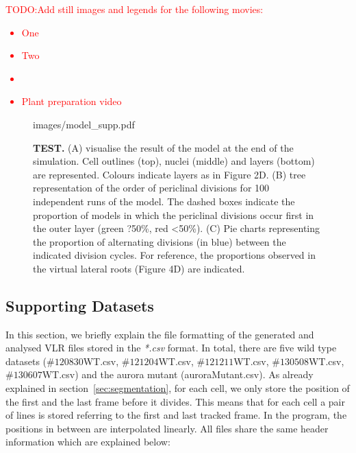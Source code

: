 \documentclass[11pt,a4paper, draft]{article}
\newcommand{\TODO}[1]{
\textcolor{red}{TODO:#1}
}
\begin{document}
%
\TODO{Add still images and legends for the following movies:
\begin{itemize}
  \item One
  \item Two
  \item 
  \item Plant preparation video
\end{itemize}
}
\begin{figure}[htbp]
	\begin{center}
	\begin{overpic}[width=1.\linewidth]{images/model_supp.pdf}
	\end{overpic}
\caption[Model of lateral root formation with random choice of division plane and  generation of  daughter cells of equal surface.]
{{\bf TEST.} (A) visualise the result of the model at the end of the simulation. Cell outlines (top), nuclei (middle) and layers (bottom) are represented. Colours indicate layers as in Figure 2D. (B)  tree representation of the order of periclinal divisions for 100 independent runs of the model. The dashed boxes indicate the proportion of models in which the periclinal divisions occur first in the outer layer (green ?50\%, red <50\%). (C) Pie charts representing the proportion of alternating divisions (in blue) between the indicated division cycles. For reference, the proportions observed in the virtual lateral roots (Figure 4D) are indicated. }
\label{fig:modelrandea}
\end{center}
\end{figure}


\subsection{Supporting Datasets}
\noindent
In this section, we briefly explain the file formatting of the generated and analysed VLR files stored in the \textit{*.csv} format. In total, there are five wild type datasets ($\#120830$WT.csv, $\#121204$WT.csv, $\#121211$WT.csv,  $\#130508$WT.csv, $\#130607$WT.csv) and the aurora mutant (auroraMutant.csv). As already explained in section~\ref{sec:segmentation}, for each cell, we only store the position of the first and the last frame before it divides. This means that for each cell a pair of lines is stored referring to the first and last tracked frame. In the program, the positions in between are interpolated linearly. All files share the same header information which are explained below:
\end{document}
